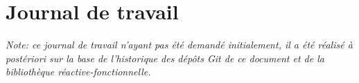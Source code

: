 \chapter{Journal de travail}

\textit{Note: ce journal de travail n'ayant pas été demandé initialement, il a été réalisé à postériori sur la base de l'historique des dépôts Git de ce document et de la bibliothèque réactive-fonctionnelle.}